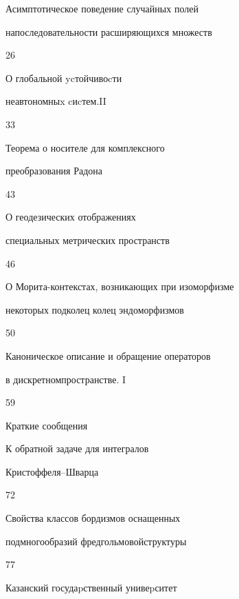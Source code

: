 

{Асимптотическое поведение случайных полей 


на\newline последовательности расширяющихся множеств}{26}







{О глобальной ycтойчивоcти


неавтономныx cиcтем.{\rm II}}{33}







{Теорема о носителе для комплексного 


преобразования Радона}{43}







{О геодезических отображениях 


специальных метрических пространств}{46}







{О Морита-контекстах, возникающих при изоморфизме


некоторых подколец \newline колец эндоморфизмов}{50}







{Каноническое описание и обращение операторов 


в дискретном\newline пространстве. {\rm I}}{59}








\bigskip


{\centerline {Краткие сообщения}}


\bigskip







{К обратной задаче для интегралов 


Кристоффеля--\newline Шварца}{72}







{Свойства классов бордизмов оснащенных


подмногообразий фредгольмовой\newline структуры}{77}











\vfill


\noindent\raisebox{2pt}{\copyright} Казанский госудаpственный унивеpситет





